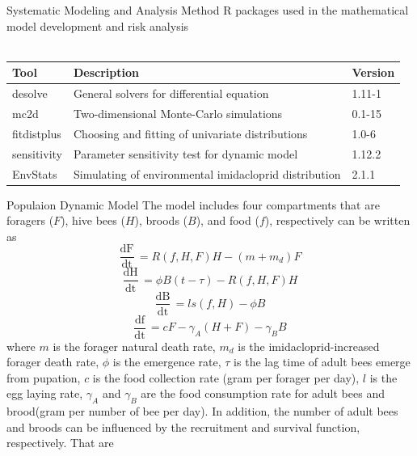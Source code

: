 \documentclass[final,t]{beamer}
\begin{document}
\begin{frame}[fragile]
\begin{columns}[t]
\begin{column}{0.19\linewidth}
\begin{block}{Systematic Modeling and Analysis Method}
R packages used in the mathematical model development and risk analysis\\
\\
\begin{tabular}{lll}
  \hline
Tool & Description & Version \\ 
  \hline
desolve & General solvers for differential equation & 1.11-1 \\ 
  mc2d & Two-dimensional Monte-Carlo simulations & 0.1-15 \\ 
  fitdistplus & Choosing and fitting of univariate distributions & 1.0-6 \\ 
  sensitivity & Parameter sensitivity test for dynamic model & 1.12.2 \\ 
  EnvStats & Simulating of environmental imidacloprid distribution & 2.1.1 \\ 
   \hline
\end{tabular}\end{block}
      \begin{block}{Populaion Dynamic Model}
        The model includes four compartments that are foragers ($F$), hive bees ($H$), broods ($B$), and food ($f$), respectively can be written as 
        \\
        \begin{equation}
          \frac{\mathrm{dF}}{\mathrm{dt}} \,= R(f,H,F)H-(m+m_d)F
        \end{equation}
        \begin{equation}
          \frac{\mathrm{dH}}{\mathrm{dt}} \,= \phi B(t-\tau)-R(f,H,F)H
        \end{equation}                
         \begin{equation}
          \frac{\mathrm{dB}}{\mathrm{dt}} \,= ls(f,H)-\phi B
        \end{equation}
        \begin{equation}
          \frac{\mathrm{df}}{\mathrm{dt}} \,= cF-\gamma_A(H+F)-\gamma_B B
        \end{equation}
        where $m$ is the forager natural death rate, $m_d$ is the imidacloprid-increased forager death rate, $\phi$ is the emergence rate, $\tau$ is the lag time of adult bees emerge from pupation, $c$ is the food collection rate (gram per forager per day), $l$ is the egg laying rate, $\gamma_A$ and $\gamma_B$ are the food consumption rate for adult bees and brood(gram per number of bee per day). In addition, the number of adult bees and broods can be influenced by the recruitment and survival function, respectively. That are

\end{block}
\end{column}
\end{columns}
\end{frame}
\end{document}
